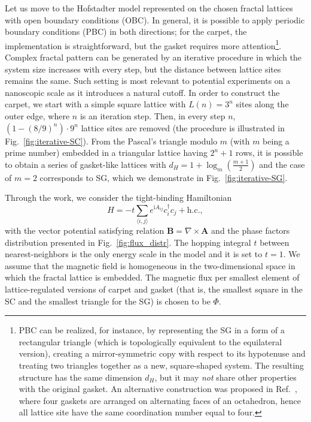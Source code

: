 Let us move to the Hofstadter model represented on the chosen fractal lattices with open boundary conditions (OBC). In general, it is possible to apply periodic boundary conditions (PBC) in both directions; for the carpet, the implementation is straightforward, but the gasket requires more attention\footnote{PBC can be realized, for instance, by representing the SG in a form of a rectangular triangle (which is topologically equivalent to the equilateral version), creating a mirror-symmetric copy with respect to its hypotenuse and treating two triangles together as a new, square-shaped system. The resulting structure has the same dimension $d_H$, but it may \emph{not} share other properties with the original gasket. An alternative construction was proposed in Ref.~\cite{PaiFractal2019}, where four gaskets are arranged on alternating faces of an octahedron, hence all lattice site have the same coordination number equal to four.}. Complex fractal pattern can be generated by an iterative procedure in which the system size increases with every step, but the distance between lattice sites remains the same. Such setting is most relevant to potential experiments on a nanoscopic scale as it introduces a natural cutoff. In order to construct the carpet, we start with a simple square lattice with $L (n) = 3^n$ sites along the outer edge, where $n$ is an iteration step. Then, in every step $n$, $ \left( 1 - ( 8 /9 )^n \right) \cdot 9^n$ lattice sites are removed (the procedure is illustrated in Fig.~\ref{fig:iterative-SC}). From the Pascal's triangle modulo $m$ (with $m$ being a prime number) embedded in a triangular lattice having $2^n + 1$ rows, it is possible to obtain a series of gasket-like lattices with $d_H = 1 + \log_m \left( \frac{m + 1}{2} \right)$ and the case of $m = 2$ corresponds to SG, which we demonstrate in Fig.~\ref{fig:iterative-SG}.

Through the work, we consider the tight-binding Hamiltonian
\begin{equation}
H = -t  \sum_{\langle i, j \rangle} e^{\mathrm{i} A_{ij}} c^{\dagger}_i c_j + \mathrm{h.c.},
\label{eq:frac_ham}
\end{equation}
with the vector potential satisfying relation $\mathbf{B} =  \nabla \times \mathbf{A}$ and the phase factors distribution presented in Fig.~\ref{fig:flux_distr}. The hopping integral $t$ between nearest-neighbors is the only energy scale in the model and it is set to $t = 1$.  We assume that the magnetic field is homogeneous in the two-dimensional space in which the fractal lattice is embedded. The magnetic flux per smallest element of lattice-regulated versions of carpet and gasket (that is, the smallest square in the SC and the smallest triangle for the SG) is chosen to be $\Phi$.

